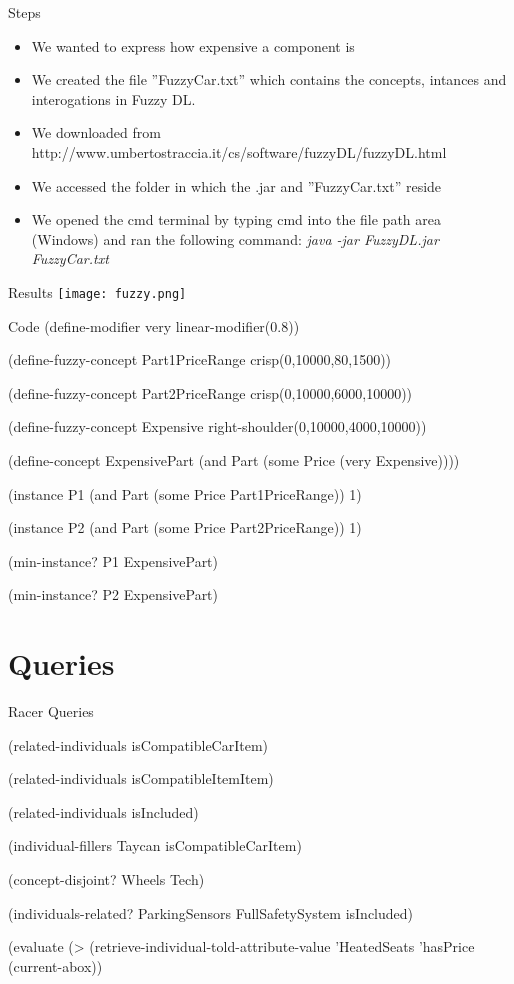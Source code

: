 \documentclass{beamer}
\begin{document}
\begin{frame}{Steps}
    \begin{itemize}
        \item We wanted to express how expensive a component is
        \item We created the file ”FuzzyCar.txt” which contains the concepts, intances and interogations in Fuzzy DL.
        \item We downloaded from http://www.umbertostraccia.it/cs/software/fuzzyDL/fuzzyDL.html
        \item We accessed the folder in which the .jar and ”FuzzyCar.txt” reside
        \item We opened the cmd terminal by typing cmd into the file path area (Windows) and ran the following command: \textit{java -jar FuzzyDL.jar FuzzyCar.txt}
    \end{itemize}
\end{frame}

\begin{frame}{Results}
    \texttt{[image: fuzzy.png]}
\end{frame}

\begin{frame}{Code}
(define-modifier very linear-modifier(0.8))

(define-fuzzy-concept Part1PriceRange crisp(0,10000,80,1500))

(define-fuzzy-concept Part2PriceRange crisp(0,10000,6000,10000))

(define-fuzzy-concept Expensive right-shoulder(0,10000,4000,10000))

(define-concept ExpensivePart (and Part (some Price (very Expensive)))) 

(instance P1 (and Part (some Price Part1PriceRange)) 1)

(instance P2 (and Part (some Price Part2PriceRange)) 1)

(min-instance? P1 ExpensivePart)

(min-instance? P2 ExpensivePart)
\end{frame}

\section{Queries}

\begin{frame}{Racer Queries}
\begin{examples}
    (related-individuals isCompatibleCarItem)

(related-individuals isCompatibleItemItem)

(related-individuals isIncluded)

(individual-fillers Taycan isCompatibleCarItem)

(concept-disjoint? Wheels Tech)

(individuals-related? ParkingSensors FullSafetySystem isIncluded)

(evaluate (> (retrieve-individual-told-attribute-value 'HeatedSeats 'hasPrice (current-abox))
\end{examples}

\end{frame}
\end{document}
